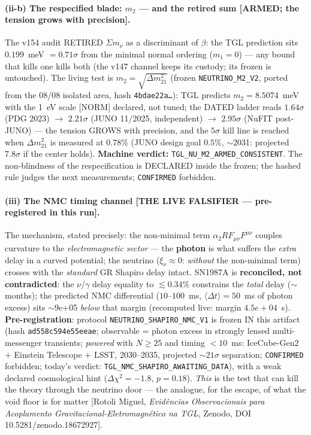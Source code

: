 \documentclass[11pt]{article}
\theoremstyle{definition}\newtheorem{deriv}{Derivation}
\begin{document}
\paragraph{(ii-b) The respecified blade: $m_2$ --- and the retired sum \textsf{[ARMED; the tension grows with precision].}} The v154 audit RETIRED $\Sigma m_\nu$ as a discriminant of $\beta$: the TGL prediction sits $0.199$~meV $=0.71\sigma$ from the minimal normal ordering ($m_1{=}0$) --- any bound that kills one kills both (the v147 channel keeps its custody; its frozen is untouched). The living test is $m_2=\sqrt{\Delta m^2_{21}}$ (frozen \texttt{NEUTRINO\_M2\_V2}, ported from the 08/08 isolated area, hash \texttt{4bdae22a\ldots}): TGL predicts $m_2=8.5074$~meV with the 1~eV scale [NORM] declared, not tuned; the DATED ladder reads $1.64\sigma$ (PDG 2023) $\to$ $2.21\sigma$ (JUNO 11/2025, independent) $\to$ $2.95\sigma$ (NuFIT post-JUNO) --- the tension GROWS with precision, and the $5\sigma$ kill line is reached when $\Delta m^2_{21}$ is measured at $0.78\%$ (JUNO design goal $0.5\%$, $\sim$2031: projected $7.8\sigma$ if the center holds). \textbf{Machine verdict:} \texttt{TGL\_NU\_M2\_ARMED\_CONSISTENT}. The non-blindness of the respecification is DECLARED inside the frozen; the hashed rule judges the next measurements; \texttt{CONFIRMED} forbidden.

\paragraph{(iii) The NMC timing channel \textsf{[THE LIVE FALSIFIER --- pre-registered in this run].}} The mechanism, stated precisely: the non-minimal term $\alpha_2 R F_{\mu\nu}F^{\mu\nu}$ \cite{rotolinmc2026} couples curvature to the \emph{electromagnetic sector} --- the \textbf{photon} is what suffers the \emph{extra} delay in a curved potential; the neutrino ($\xi_\nu\approx0$: \emph{without} the non-minimal term) crosses with the \emph{standard} GR Shapiro delay intact. SN1987A is \textbf{reconciled, not contradicted}: the $\nu/\gamma$ delay equality to $\lesssim0.34\%$ \cite{longo1988,krauss1988} constrains the \emph{total} delay ($\sim$months); the predicted NMC differential ($10$--$100$~ms, $\langle\Delta t\rangle=50$~ms of photon excess) sits $\sim$9e+05 \emph{below} that margin (recomputed live: margin $4.5e+04$~s). \textbf{Pre-registration}: protocol \texttt{NEUTRINO\_SHAPIRO\_NMC\_V1} is frozen IN this artifact (hash \texttt{ad558c594e55eeae}; observable = photon excess in strongly lensed multi-messenger transients; \emph{powered} with $N\geq25$ and timing $<10$~ms: IceCube-Gen2 $+$ Einstein Telescope $+$ LSST, 2030--2035, projected $\sim21\sigma$ separation; \texttt{CONFIRMED} forbidden; today's verdict: \texttt{TGL\_NMC\_SHAPIRO\_AWAITING\_DATA}), with a weak declared cosmological hint ($\Delta\chi^2=-1.8$, $p=0.18$). \emph{This} is the test that can kill the theory through the neutrino door --- the analogue, for the escape, of what the void floor is for matter [Rotoli Miguel, \emph{Evidências Observacionais para Acoplamento Gravitacional-Eletromagnético na TGL}, Zenodo, DOI 10.5281/zenodo.18672927].
\end{document}
